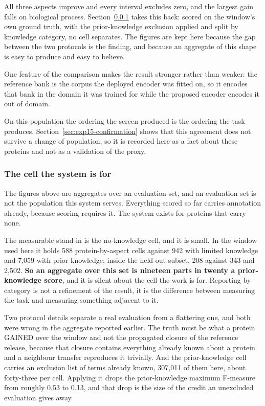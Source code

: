 All three aspects improve and every interval excludes zero, and the largest gain falls
on biological process. Section~\ref{sec:exp15-category} takes this back: scored on the
window's own ground truth, with the prior-knowledge exclusion applied and split by
knowledge category, no cell separates. The figures are kept here because the gap
between the two protocols is the finding, and because an aggregate of this shape is
easy to produce and easy to believe.

One feature of the comparison makes the result stronger rather than weaker: the
reference bank is the corpus the deployed encoder was fitted on, so it encodes that
bank in the domain it was trained for while the proposed encoder encodes it out of
domain.

On this population the ordering the screen produced is the ordering the task
produces. Section~\ref{sec:exp15-confirmation} shows that this agreement does not
survive a change of population, so it is recorded here as a fact about these
proteins and not as a validation of the proxy.

\subsubsection{The cell the system is for}
\label{sec:exp15-category}

The figures above are aggregates over an evaluation set, and an evaluation set is not
the population this system serves. Everything scored so far carries annotation
already, because scoring requires it. The system exists for proteins that carry none.

The measurable stand-in is the no-knowledge cell, and it is small. In the window used
here it holds 588 protein-by-aspect cells against 942 with limited knowledge and 7,059
with prior knowledge; inside the held-out subset, 208 against 343 and 2,502. \textbf{So an
aggregate over this set is nineteen parts in twenty a prior-knowledge score}, and it
is silent about the cell the work is for. Reporting by category is not a refinement of
the result, it is the difference between measuring the task and measuring something
adjacent to it.

Two protocol details separate a real evaluation from a flattering one, and both were
wrong in the aggregate reported earlier. The truth must be what a protein GAINED over
the window and not the propagated closure of the reference release, because that
closure contains everything already known about a protein and a neighbour transfer
reproduces it trivially. And the prior-knowledge cell carries an exclusion list of
terms already known, 307,011 of them here, about forty-three per cell. Applying it
drops the prior-knowledge maximum F-measure from roughly 0.53 to 0.13, and that drop
is the size of the credit an unexcluded evaluation gives away.

